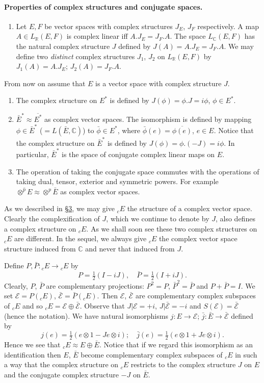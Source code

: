 \paragraph{Properties of complex structures and conjugate spaces.}
\begin{enumerate}
\item Let $E,F$ be vector spaces with complex structures $J_E$, $J_F$ respectively. A map $A\in L_{\mathbb R}(E,F)$ is complex linear iff $A.J_E=J_F.A$. The space $L_{\mathbb C}(E,F)$ has the natural complex structure $J$ defined by $J(A)=A.J_E=J_F.A$. We may define two \emph{distinct} complex structures $J_1$, $J_2$ on $L_{\mathbb R}(E,F)$ by $J_1(A)=A.J_E$; $J_2(A)=J_F.A$.
\end{enumerate}
From now on assume that $E$ is a vector space with complex structure $J$.
\begin{enumerate}[start=2]
\item The complex structure on $E^*$ is defined by $J(\phi)=\phi.J=i\phi$, $\phi\in E^*$.
\item $\bar E^*\approx\overline{E^*}$ as complex vector spaces. The isomorphism is defined by mapping $\phi\in\bar E^*$ ($=L(\bar E,\mathbb C)$) to $\bar\phi\in E^*$, where $\bar\phi(e)=\overline{\phi(e)}$, $e\in E$. Notice that the complex structure on $\bar E^*$ is defined by $J(\phi)=\phi.(-J)=i\phi$. In particular, $\bar E^*$ is the space of conjugate complex linear maps on $E$.
\item The operation of taking the conjugate space commutes with the operations of taking dual, tensor, exterior and symmetric powers. For example $\overline{\otimes^p E}\approx\otimes^p\bar E$ as complex vector spaces.
\end{enumerate}
As we described in \hyperref[sec:5:3]{\S3}, we may give ${}_cE$ the structure of a complex vector space. Clearly the complexification of $J$, which we continue to denote by $J$, also defines a complex structure on ${}_cE$. As we shall soon see these two complex structures on ${}_cE$ are different. In the sequel, we always give ${}_cE$ the complex vector space structure induced from $\mathbb C$ and never that induced from $J$.

Define $P,\bar P:{}_cE\to{}_cE$ by
\[
P=\tfrac12(I-iJ),\quad\bar P=\tfrac12(I+iJ).
\]
Clearly, $P$, $\bar P$ are complementary projections: $P^2=P$, $\bar P^2=\bar P$ and $P+\bar P=I$. We set $\mathcal E=P({}_cE)$, $\bar{\mathcal E}=\bar P({}_cE)$. Then $\mathcal E$, $\bar{\mathcal E}$ are complementary complex subspaces of ${}_cE$ and so ${}_cE=\mathcal E\oplus\bar{\mathcal E}$. Observe that $J|\mathcal E=+i$,
$J|\bar{\mathcal E}=-i$ and $S(\mathcal E)=\bar{\mathcal E}$ (hence the notation). We have natural isomorphisms $j:E\to\mathcal E$; $\bar j:\bar E\to\bar{\mathcal E}$ defined by
\[
j(e)=\tfrac12(e\otimes1-Je\otimes i);\quad\bar j(e)=\tfrac12(e\otimes1+Je\otimes i).
\]
Hence we see that ${}_cE\approx E\oplus\bar E$. Notice that if we regard this isomorphism as an identification then $E$, $\bar E$ become complementary complex subspaces of ${}_cE$ in such a way that the complex structure on ${}_cE$ restricts to the complex structure $J$ on $E$ and the conjugate complex structure $-J$ on $\bar E$.

